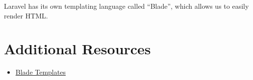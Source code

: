Laravel has its own templating language called ``Blade'', which allows us to easily render HTML.

\section{Additional Resources}

\begin{itemize}[leftmargin=*]
    \item \href{http://laravel.com/docs/master/blade}{Blade Templates}
\end{itemize}
